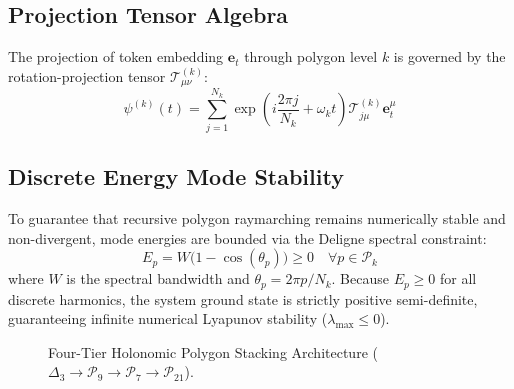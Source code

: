\documentclass[11pt,oneside,letterpaper]{article}
\theoremstyle{definition}
\begin{document}
\subsection{Projection Tensor Algebra}
The projection of token embedding $\mathbf{e}_t$ through polygon level $k$ is governed by the rotation-projection tensor $\mathcal{T}_{\mu\nu}^{(k)}$:
\begin{equation}
\psi^{(k)}(t) = \sum_{j=1}^{N_k} \exp\left(i \frac{2\pi j}{N_k} + \omega_k t\right) \mathcal{T}_{j\mu}^{(k)} \mathbf{e}_t^\mu
\end{equation}

\subsection{Discrete Energy Mode Stability}
To guarantee that recursive polygon raymarching remains numerically stable and non-divergent, mode energies are bounded via the Deligne spectral constraint:
\begin{equation}
E_p = W \big(1 - \cos(\theta_p)\big) \ge 0 \quad \forall p \in \mathcal{P}_k
\end{equation}
where $W$ is the spectral bandwidth and $\theta_p = 2\pi p / N_k$. Because $E_p \ge 0$ for all discrete harmonics, the system ground state is strictly positive semi-definite, guaranteeing infinite numerical Lyapunov stability ($\lambda_{\text{max}} \le 0$).

\begin{figure}[htbp]
\centering
{}
\caption{Four-Tier Holonomic Polygon Stacking Architecture ($\Delta_3 \to \mathcal{P}_9 \to \mathcal{P}_7 \to \mathcal{P}_{21}$).}
\label{fig:poly_stack}
\end{figure}
\end{document}
